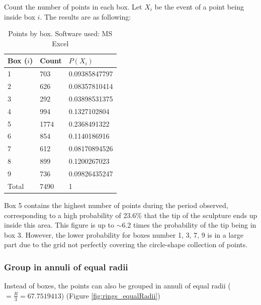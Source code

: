 \documentclass[a4paper,12pt]{article}
\begin{document}
    Count the number of points in each box. Let $X_i$ be the event of a point being inside box $i$. The results are as following:
\begin{table}[H]
    \centering
    \begin{tabular}{|l|l|l|}
        \toprule
        Box ($i$) & Count & $P(X_i)$\\ 
        \midrule
        1 & 703 & 0.09385847797\\
        2 & 626 & 0.08357810414\\
        3 & 292 & 0.03898531375\\
        4 & 994 & 0.1327102804\\
        5 & 1774 & 0.2368491322\\
        6 & 854 & 0.1140186916\\
        7 & 612 & 0.08170894526\\
        8 & 899 & 0.1200267023\\
        9 & 736 & 0.09826435247\\
        \midrule
        Total & 7490 & 1\\
        \bottomrule
    \end{tabular}  
    \caption{\label{tab:box}Points by box. Software used: MS Excel}
\end{table}   
    Box 5 contains the highest number of points during the period observed, corresponding to a high probability of 23.6\% that the tip of the sculpture ends up inside this area. This figure is up to $\sim$6.2 times the probability of the tip being in box 3. However, the lower probability for boxes number 1, 3, 7, 9 is in a large part due to the grid not perfectly covering the circle-shape collection of points.

    \subsubsection{Group in annuli of equal radii}

    Instead of boxes, the points can also be grouped in annuli of equal radii ($= \frac{R}{3} = 67.7519413$) (Figure \ref{fig:rings_equalRadii})
\end{document}
